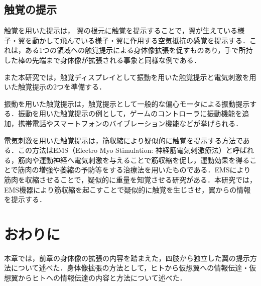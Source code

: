 
    
    \subsection{触覚の提示}

        触覚を用いた提示は，
        翼の根元に触覚を提示することで，翼が生えている様子・翼を動かして飛んでいる様子・翼に作用する空気抵抗の感覚を提示する．これは，ある1つの領域への触覚提示による身体像拡張を促すものあり，手で所持した棒の先端まで身体像が拡張される事象と同様な例である．
        
        また本研究では，触覚ディスプレイとして振動を用いた触覚提示と電気刺激を用いた触覚提示の2つを準備する．
        
        振動を用いた触覚提示は，触覚提示として一般的な偏心モータによる振動提示する．振動を用いた触覚提示の例として，ゲームのコントローラに振動機能を追加\cite{shim2020fs}，携帯電話やスマートフォンのバイブレーション機能などが挙げられる．

        電気刺激を用いた触覚提示は，筋収縮により疑似的に触覚を提示する方法である．この方法はEMS（Electro Myo Stimulation: 神経筋電気刺激療法）と呼ばれる，筋肉や運動神経へ電気刺激を与えることで筋収縮を促し，運動効果を得ることで筋肉の増強や萎縮の予防等をする治療法を用いたものである．EMSにより筋肉を収縮させることで，疑似的に重量を知覚させる研究がある\cite{小川剛史2017電気的筋肉刺激が重量知覚に及ぼす影響の分析}．本研究では，EMS機器により筋収縮を起こすことで疑似的に触覚を生じさせ，翼からの情報を提示する．

\section{おわりに}
    本章では，前章の身体像の拡張の内容を踏まえた，四肢から独立した翼の提示方法について述べた．身体像拡張の方法として，ヒトから仮想翼への情報伝達・仮想翼からヒトへの情報伝達の内容と方法について述べた．
